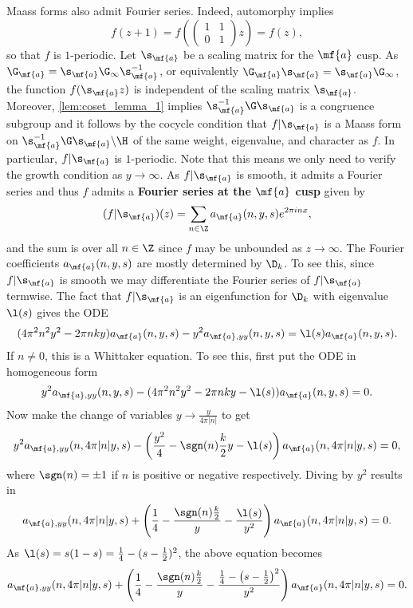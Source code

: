     Maass forms also admit Fourier series. Indeed, automorphy implies
    \[
      f(z+1) = f\left(\begin{pmatrix} 1 & 1 \\ 0 & 1 \end{pmatrix}z\right) = f(z),
    \]
    so that $f$ is $1$-periodic. Let $\s_{\mf{a}}$ be a scaling matrix for the $\mf{a}$ cusp. As $\G_{\mf{a}} = \s_{\mf{a}}\G_{\infty}\s_{\mf{a}}^{-1}$, or equivalently $\G_{\mf{a}}\s_{\mf{a}} = \s_{\mf{a}}\G_{\infty}$, the function $f(\s_{\mf{a}}z)$ is independent of the scaling matrix $\s_{\mf{a}}$. Moreover, \cref{lem:coset_lemma_1} implies $\s_{\mf{a}}^{-1}\G\s_{\mf{a}}$ is a congruence subgroup and it follows by the cocycle condition that $f|\s_{\mf{a}}$ is a Maass form on $\s_{\mf{a}}^{-1}\G\s_{\mf{a}}\backslash\H$ of the same weight, eigenvalue, and character as $f$. In particular, $f|\s_{\mf{a}}$ is $1$-periodic. Note that this means we only need to verify the growth condition as $y \to \infty$. As $f|\s_{\mf{a}}$ is smooth, it admits a Fourier series and thus $f$ admits a \textbf{Fourier series at the $\mf{a}$ cusp} given by
    \[
      (f|\s_{\mf{a}})(z) = \sum_{n \in \Z}a_{\mf{a}}(n,y,s)e^{2\pi inx},
    \]
    and the sum is over all $n \in \Z$ since $f$ may be unbounded as $z \to \infty$. The Fourier coefficients $a_{\mf{a}}(n,y,s)$ are mostly determined by $\D_{k}$. To see this, since $f|\s_{\mf{a}}$ is smooth we may differentiate the Fourier series of $f|\s_{\mf{a}}$ termwise. The fact that $f|\s_{\mf{a}}$ is an eigenfunction for $\D_{k}$ with eigenvalue $\l(s)$ gives the ODE
    \[
      (4\pi^{2}n^{2}y^{2}-2\pi nky)a_{\mf{a}}(n,y,s)-y^{2}a_{\mf{a},yy}(n,y,s) = \l(s)a_{\mf{a}}(n,y,s).
    \]
    If $n \neq 0$, this is a Whittaker equation. To see this, first put the ODE in homogeneous form
    \[
      y^{2}a_{\mf{a},yy}(n,y,s)-(4\pi^{2}n^{2}y^{2}-2\pi nky-\l(s))a_{\mf{a}}(n,y,s) = 0.
    \]
    Now make the change of variables $y \to \frac{y}{4\pi|n|}$ to get
    \[
      y^{2}a_{\mf{a},yy}(n,4\pi|n|y,s)-\left(\frac{y^{2}}{4}-\sgn(n)\frac{k}{2}y-\l(s)\right)a_{\mf{a}}(n,4\pi|n|y,s) = 0,
    \]
    where $\sgn(n) = \pm1$ if $n$ is positive or negative respectively. Diving by $y^{2}$ results in
    \[
      a_{\mf{a},yy}(n,4\pi|n|y,s)+\left(\frac{1}{4}-\frac{\sgn(n)\frac{k}{2}}{y}-\frac{\l(s)}{y^{2}}\right)a_{\mf{a}}(n,4\pi|n|y,s) = 0.
    \]
    As $\l(s) = s(1-s) = \frac{1}{4}-(s-\frac{1}{2})^{2}$, the above equation becomes
    \[
      a_{\mf{a},yy}(n,4\pi|n|y,s)+\left(\frac{1}{4}-\frac{\sgn(n)\frac{k}{2}}{y}-\frac{\frac{1}{4}-\left(s-\frac{1}{2}\right)^{2}}{y^{2}}\right)a_{\mf{a}}(n,4\pi|n|y,s) = 0.
    \]
